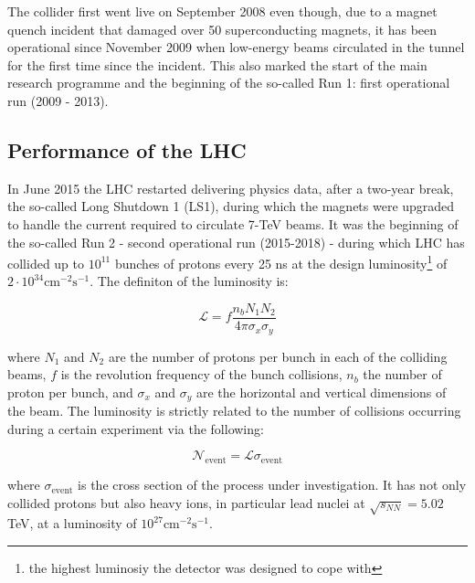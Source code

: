 		The collider first went live on September 2008 even though, due to a magnet quench incident that damaged over 50 superconducting magnets, it has been operational since November 2009 when low-energy beams circulated in the tunnel for the first time since the incident. This also marked the start of the main research programme and the beginning of the so-called Run 1: first operational run (2009 - 2013).


		\subsection*{Performance of the LHC}

			In June 2015 the LHC restarted delivering physics data, after a two-year break, the so-called Long Shutdown 1 (LS1), during which the magnets were upgraded to handle the current required to circulate 7-TeV beams. It was the beginning of the so-called Run 2 - second operational run (2015-2018) - during which LHC has collided up to $10^{11}$ bunches of protons every 25 ns at the design luminosity\footnote{the highest luminosiy the detector was designed to cope with} of $2 \cdot 10^{34} \mathrm{cm}^{-2}\mathrm{s}^{-1}$. The definiton of the luminosity is:

			\begin{equation}
				{\mathcal L} = f \frac{n_b N_1 N_2}{4 \pi \sigma_x \sigma_y}
			\label{eq:lumi}
			\end{equation}

			\noindent where $N_1$ and $N_2$ are the number of protons per bunch in each of the colliding beams, $f$ is the revolution frequency of the bunch collisions, $n_b$ the number of proton per bunch, and $\sigma_x$ and $\sigma_y$ are the horizontal and vertical dimensions of the beam. The luminosity is strictly related to the number of collisions occurring during a certain experiment via the following: 

			\begin{equation}
					{\mathcal N}_{\mathrm{event}} = {\mathcal L} \sigma_{\mathrm{event}}
			\label{eq:lumiEvt}
			\end{equation}

			\noindent where $\sigma_{\mathrm{event}}$ is the cross section of the process under investigation.  It has not only collided protons but also heavy ions, in particular lead nuclei at $\sqrt{s_{NN}} = 5.02$ TeV, at a luminosity of $10^{27} \mathrm{cm}^{-2} \mathrm{s}^{-1}$\cite{HI2015}.



